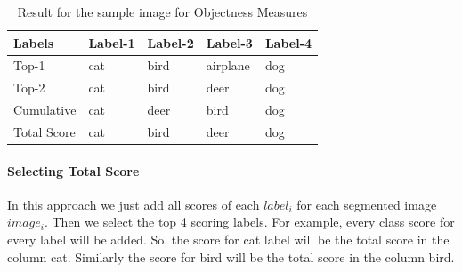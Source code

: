 

\begin{table}
\centering
\caption{Result for the sample image for Objectness Measures}
\label{resobj}
\begin{tabularx}{\linewidth}{|*{5}{X|}}
\hline
Labels      & Label-1 & Label-2 & Label-3 & Label-4 \\ \hline
Top-1       & cat     & bird   & airplane & dog           \\ \hline
Top-2       & cat     & bird   & deer     & dog           \\ \hline
Cumulative  & cat     & deer   & bird     & dog            \\ \hline
Total Score & cat     & bird   & deer     & dog           \\ \hline
\end{tabularx}
\end{table}
\paragraph{Selecting Total Score}
In this approach we just add all scores of each $label_{i}$ for each segmented image $image_{i}$. Then we select the top 4 scoring labels. For example, every class score for every label will be added. So, the score for cat label will be the total score in the column cat. Similarly the score for bird will be the total score in the column bird.




